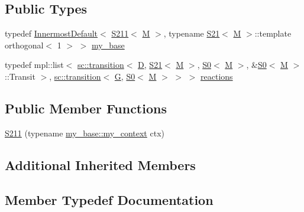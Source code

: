 \subsection*{Public Types}
\begin{DoxyCompactItemize}
\item 
typedef \mbox{\hyperlink{struct_innermost_default}{Innermost\+Default}}$<$ \mbox{\hyperlink{struct_s211}{S211}}$<$ \mbox{\hyperlink{struct_m}{M}} $>$, typename \mbox{\hyperlink{struct_s21}{S21}}$<$ \mbox{\hyperlink{struct_m}{M}} $>$\+::template orthogonal$<$ 1 $>$ $>$ \mbox{\hyperlink{struct_s211_a172b794daf227a390ed097773909f4dd}{my\+\_\+base}}
\item 
typedef mpl\+::list$<$ \mbox{\hyperlink{classboost_1_1statechart_1_1transition}{sc\+::transition}}$<$ \mbox{\hyperlink{struct_d}{D}}, \mbox{\hyperlink{struct_s21}{S21}}$<$ \mbox{\hyperlink{struct_m}{M}} $>$, \mbox{\hyperlink{struct_s0}{S0}}$<$ \mbox{\hyperlink{struct_m}{M}} $>$, \&\mbox{\hyperlink{struct_s0}{S0}}$<$ \mbox{\hyperlink{struct_m}{M}} $>$\+::Transit $>$, \mbox{\hyperlink{classboost_1_1statechart_1_1transition}{sc\+::transition}}$<$ \mbox{\hyperlink{struct_g}{G}}, \mbox{\hyperlink{struct_s0}{S0}}$<$ \mbox{\hyperlink{struct_m}{M}} $>$ $>$ $>$ \mbox{\hyperlink{struct_s211_a241591925fcba8a8940f0680d1b42429}{reactions}}
\end{DoxyCompactItemize}
\subsection*{Public Member Functions}
\begin{DoxyCompactItemize}
\item 
\mbox{\hyperlink{struct_s211_a404920e03945d6ba60c1d4b46d50105b}{S211}} (typename \mbox{\hyperlink{struct_innermost_default_a0aab337364dec3101e80f293b709d53d}{my\+\_\+base\+::my\+\_\+context}} ctx)
\end{DoxyCompactItemize}
\subsection*{Additional Inherited Members}


\subsection{Member Typedef Documentation}
\mbox{\label{struct_s211_a172b794daf227a390ed097773909f4dd}} 
